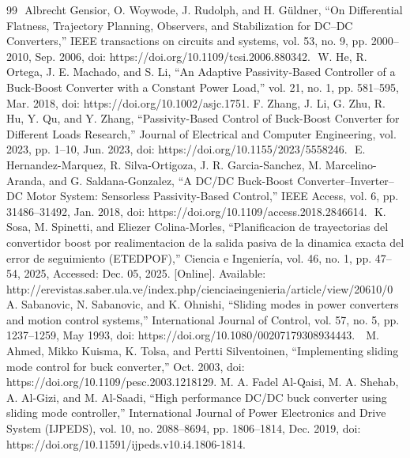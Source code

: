 \documentclass[12pt,oneside,openany]{book}
\begin{document}
\begin{thebibliography}{99}
‌%
Albrecht Gensior, O. Woywode, J. Rudolph, and H. Güldner, “On Differential Flatness, Trajectory Planning, Observers, and Stabilization for DC–DC Converters,” IEEE transactions on circuits and systems, vol. 53, no. 9, pp. 2000–2010, Sep. 2006, doi: https://doi.org/10.1109/tcsi.2006.880342.
‌%
W. He, R. Ortega, J. E. Machado, and S. Li, “An Adaptive Passivity‐Based Controller of a Buck‐Boost Converter with a Constant Power Load,” vol. 21, no. 1, pp. 581–595, Mar. 2018, doi: https://doi.org/10.1002/asjc.1751.
‌F. Zhang, J. Li, G. Zhu, R. Hu, Y. Qu, and Y. Zhang, “Passivity-Based Control of Buck-Boost Converter for Different Loads Research,” Journal of Electrical and Computer Engineering, vol. 2023, pp. 1–10, Jun. 2023, doi: https://doi.org/10.1155/2023/5558246.
‌%
E. Hernandez-Marquez, R. Silva-Ortigoza, J. R. Garcia-Sanchez, M. Marcelino-Aranda, and G. Saldana-Gonzalez, “A DC/DC Buck-Boost Converter–Inverter–DC Motor System: Sensorless Passivity-Based Control,” IEEE Access, vol. 6, pp. 31486–31492, Jan. 2018, doi: https://doi.org/10.1109/access.2018.2846614.
‌%
K. Sosa, M. Spinetti, and Eliezer Colina-Morles, “Planificacion de trayectorias del convertidor boost por realimentacion de la salida pasiva de la dinamica exacta del error de seguimiento (ETEDPOF),” Ciencia e Ingeniería, vol. 46, no. 1, pp. 47–54, 2025, Accessed: Dec. 05, 2025. [Online]. Available: http://erevistas.saber.ula.ve/index.php/cienciaeingenieria/article/view/20610/0
A. Sabanovic, N. Sabanovic, and K. Ohnishi, “Sliding modes in power converters and motion control systems,” International Journal of Control, vol. 57, no. 5, pp. 1237–1259, May 1993, doi: https://doi.org/10.1080/00207179308934443.
‌
‌%
M. Ahmed, Mikko Kuisma, K. Tolsa, and Pertti Silventoinen, “Implementing sliding mode control for buck converter,” Oct. 2003, doi: https://doi.org/10.1109/pesc.2003.1218129.
M. A. Fadel Al-Qaisi, M. A. Shehab, A. Al-Gizi, and M. Al-Saadi, “High performance DC/DC buck converter using sliding mode controller,” International Journal of Power Electronics and Drive System (IJPEDS), vol. 10, no. 2088–8694, pp. 1806–1814, Dec. 2019, doi: https://doi.org/10.11591/ijpeds.v10.i4.1806-1814.


\end{thebibliography}
\end{document}
